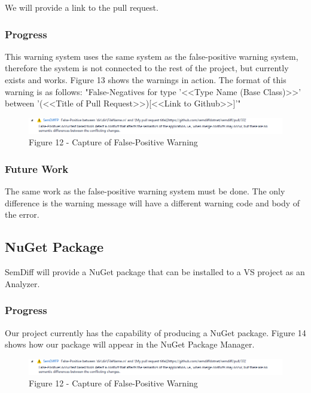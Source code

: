 \documentclass[10pt,draftclsnofoot,onecolumn]{IEEEtran}
\begin{document}
We will provide a link to the pull request.

\subsubsection{Progress}
This warning system uses the same system as the false-positive warning system, therefore the system is not connected to the rest of the project, but currently exists and works.
Figure 13 shows the warnings in action. The format of this warning is as follows:
"False-Negatives for type '<<Type Name (Base Class)>>' between '(<<Title of Pull Request>>)[<<Link to Github>>]'"

\begin{figure}[h!]
	\includegraphics[width=\linewidth]{falsePositiveWarning.png}
	\caption*{Figure 12 - Capture of False-Positive Warning}
\end{figure}

\subsubsection{Future Work}
The same work as the false-positive warning system must be done. The only difference is the warning message will have a different warning code and body of the error.

\subsection{NuGet Package}
SemDiff will provide a NuGet package that can be installed to a VS project as an Analyzer.

\subsubsection{Progress}
Our project currently has the capability of producing a NuGet package. Figure 14 shows how our package will appear in the NuGet Package Manager.

\begin{figure}[h!]
	\includegraphics[width=\linewidth]{falsePositiveWarning.png}
	\caption*{Figure 12 - Capture of False-Positive Warning}
\end{figure}
\end{document}
